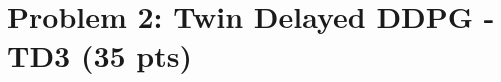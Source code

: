 \documentclass[12pt]{article}
\begin{document}









\newpage


\section*{Problem 2: Twin Delayed DDPG - TD3 (35 pts)}
\end{document}
